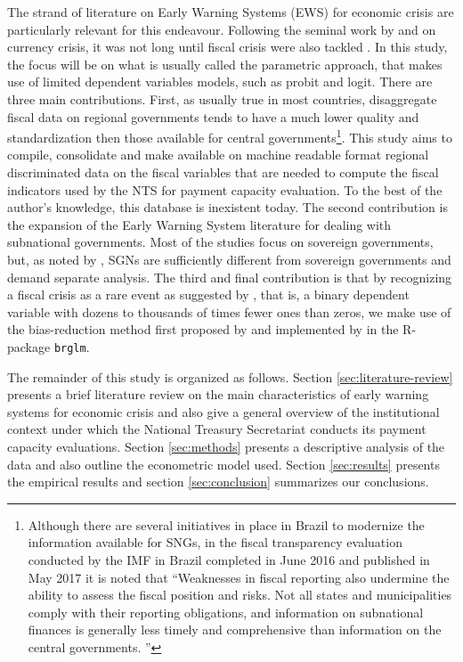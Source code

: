 The strand of literature on Early Warning Systems (EWS) for economic crisis are particularly relevant for this endeavour. Following the seminal work by \citet{kaminsky1998} and \citet{berg1999} on currency crisis, it was not long until fiscal crisis were also tackled \citep{manasse2003, fuertes2007, baldacci2011b, berti2012, dawood2017}. In this study, the focus will be on what is usually called the parametric approach, that makes use of limited dependent variables models, such as probit and logit. There are three main contributions. First, as usually true in most countries, disaggregate fiscal data on regional governments tends to have a much lower quality and standardization then those available for central governments\footnote{Although there are several initiatives in place in Brazil to modernize the information available for SNGs, in the fiscal transparency evaluation conducted by the IMF in Brazil completed in June 2016 and published in May 2017 it is noted that ``Weaknesses in fiscal reporting also undermine the ability to assess the fiscal position and risks. Not all states and municipalities comply with their reporting obligations, and information on subnational finances is generally less timely and comprehensive than information on the central governments. \citep[p. 62]{imf2017}''}. This study aims to compile, consolidate and make available on machine readable format regional discriminated data on the fiscal variables that are needed to compute the fiscal indicators used by the NTS for payment capacity evaluation. To the best of the author's knowledge, this database is inexistent today. The second contribution is the expansion of the Early Warning System literature for dealing with subnational governments. Most of the studies focus on sovereign governments, but, as noted by \citet{ianchovichina2007}, SGNs are sufficiently different from sovereign governments and demand separate analysis. The third and final contribution is that by recognizing a fiscal crisis as a rare event as suggested by \citet{king2001a}, that is, a binary dependent variable with dozens to thousands of times fewer ones than zeros, we make use of the bias-reduction method first proposed by \citet{firth1993} and implemented by \citet{brglm} in the R-package \texttt{brglm}.

The remainder of this study is organized as follows. Section \ref{sec:literature-review} presents a brief literature review on the main characteristics of early warning systems for economic crisis and also give a general overview of the institutional context under which the National Treasury Secretariat conducts its payment capacity evaluations. Section \ref{sec:methods} presents a descriptive analysis of the data and also outline the econometric model used. Section \ref{sec:results} presents the empirical results and section \ref{sec:conclusion} summarizes our conclusions.
